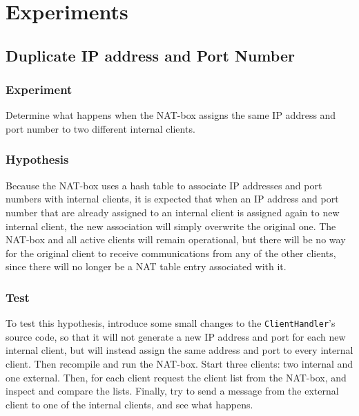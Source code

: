 \documentclass[10pt, a4paper]{article}
\begin{document}

\section{Experiments}
\label{sec:exp}


\subsection{Duplicate IP address and Port Number}
\label{ssec:dup}


\subsubsection{Experiment}
\label{sssec:dupexp}

Determine what happens when the NAT-box assigns the same IP address and port
number to two different internal clients.


\subsubsection{Hypothesis}
\label{sssec:duphyp}

Because the NAT-box uses a hash table to associate IP addresses and port numbers
with internal clients, it is expected that when an IP address and port number
that are already assigned to an internal client is assigned again to new
internal client, the new association will simply overwrite the original one. The
NAT-box and all active clients will remain operational, but there will be no way
for the original client to receive communications from any of the other clients,
since there will no longer be a NAT table entry associated with it.


\subsubsection{Test}
\label{sssec:duptest}

To test this hypothesis, introduce some small changes to the
\texttt{ClientHandler}'s source code, so that it will not generate a new IP
address and port for each new internal client, but will instead assign the same
address and port to every internal client. Then recompile and run the NAT-box.
Start three clients: two internal and one external. Then, for each client
request the client list from the NAT-box, and inspect and compare the lists.
Finally, try to send a message from the external client to one of the internal
clients, and see what happens.
\end{document}
